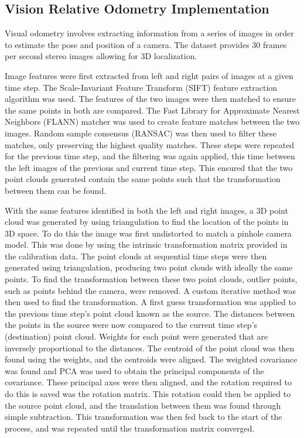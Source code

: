 \documentclass[bare_jrnl_transmag]{subfiles}
\begin{document}
\subsection{Vision Relative Odometry Implementation}

Visual odometry involves extracting information from a series of images in order to estimate the pose and position of a camera. The dataset provides 30 frames per second stereo images allowing for 3D localization. \newline 

Image features were first extracted from left and right pairs of images at a given time step. The Scale-Invariant Feature Transform (SIFT) feature extraction algorithm was used. The features of the two images were then matched to ensure the same points in both are compared. The Fast Library for Approximate Nearest Neighbors (FLANN) matcher was used to create feature matches between the two images.  Random sample consensus (RANSAC) was then used to filter these matches, only preserving the highest quality matches.  These steps were repeated for the previous time step, and the filtering was again applied, this time between the left images of the previous and current time step. This ensured that the two point clouds generated contain the same points such that the transformation between them can be found. \newline

With the same features identified in both the left and right images, a 3D point cloud was generated by using triangulation to find the location of the points in 3D space. To do this the image was first undistorted to match a pinhole camera model. This was done by using the intrinsic transformation matrix provided in the calibration data. The point clouds at sequential time steps were then generated using triangulation, producing two point clouds with ideally the same points. To find the transformation between these two point clouds, outlier points, such as points behind the camera, were removed. A custom iterative method was then used to find the transformation. A first guess transformation was applied to the previous time step's point cloud known as the source. The distances between the points in the source were now compared to the current time step's (destination) point cloud. Weights for each point were generated that are inversely proportional to the distances. The centroid of the point cloud was then found using the weights, and the centroids were aligned. The weighted covariance was found and PCA was used to obtain the principal components of the covariance. These principal axes were then aligned, and the rotation required to do this is saved was the rotation matrix. This rotation could then be applied to the source point cloud, and the translation between them was found through simple subtraction. This transformation was then fed back to the start of the process, and was repeated until the transformation matrix converged. \newline
\end{document}
